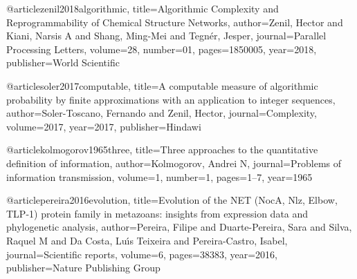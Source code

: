 @article{zenil2018algorithmic,
  title={Algorithmic Complexity and Reprogrammability of Chemical Structure Networks},
  author={Zenil, Hector and Kiani, Narsis A and Shang, Ming-Mei and Tegn{\'e}r, Jesper},
  journal={Parallel Processing Letters},
  volume={28},
  number={01},
  pages={1850005},
  year={2018},
  publisher={World Scientific}
}

@article{soler2017computable,
  title={A computable measure of algorithmic probability by finite approximations with an application to integer sequences},
  author={Soler-Toscano, Fernando and Zenil, Hector},
  journal={Complexity},
  volume={2017},
  year={2017},
  publisher={Hindawi}
}

@article{kolmogorov1965three,
  title={Three approaches to the quantitative definition of information},
  author={Kolmogorov, Andrei N},
  journal={Problems of information transmission},
  volume={1},
  number={1},
  pages={1--7},
  year={1965}
}

@article{pereira2016evolution,
  title={Evolution of the {NET} ({NocA}, {Nlz}, {Elbow}, {TLP-1}) protein family in metazoans: insights from expression data and phylogenetic analysis},
  author={Pereira, Filipe and Duarte-Pereira, Sara and Silva, Raquel M and Da Costa, Lu{\'\i}s Teixeira and Pereira-Castro, Isabel},
  journal={Scientific reports},
  volume={6},
  pages={38383},
  year={2016},
  publisher={Nature Publishing Group}
}